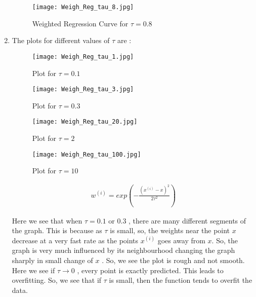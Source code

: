 \documentclass{article}
\begin{document}
\begin{enumerate}[label=(\alph*)]
        \begin{figure}[H]
            \centering
            \texttt{[image: Weigh\_Reg\_tau\_8.jpg]}
            \caption{Weighted Regression Curve for $\tau = 0.8$}
            \label{Linear_Reg_Cont_13}
         \end{figure}
         
         
    \item The plots for different values of $\tau$ are :
    
    \begin{figure}[H]
         \begin{minipage}{0.49 \textwidth}
            \texttt{[image: Weigh\_Reg\_tau\_1.jpg]}
            \caption{Plot for $\tau = 0.1$}
            \label{Linear_Reg_Cont_5}
         \end{minipage}
         \begin{minipage}{0.49 \textwidth}
            \texttt{[image: Weigh\_Reg\_tau\_3.jpg]}
            \caption{Plot for $\tau = 0.3$}
            \label{Linear_Reg_Cont_9}
            \end{minipage}
            
         \end{figure}
         
    \begin{figure}[H]
         \begin{minipage}{0.49 \textwidth}
            \texttt{[image: Weigh\_Reg\_tau\_20.jpg]}
            \caption{Plot for $\tau = 2$}
            \label{Linear_Reg_Cont_5}
         \end{minipage}
         \begin{minipage}{0.49 \textwidth}
            \texttt{[image: Weigh\_Reg\_tau\_100.jpg]}
            \caption{Plot for $\tau = 10$}
            \label{Linear_Reg_Cont_9}
            \end{minipage}
            
         \end{figure}
         
         \begin{align*}
           w^{(i)} = exp(-\frac{(x^{(i)}-x)^2}{2\tau^2})
        \end{align*}  
         
         
         Here we see that when $\tau = 0.1$ or $0.3$ , there are many different segments of the graph. This is because as $\tau$ is small, so, the weights near the point $x$ decrease at a very fast rate as the points $x^{(i)}$ goes away from $x$. So, the graph is very much influenced by its neighbourhood changing the graph sharply in small change of $x$ . So, we see the plot is rough and not smooth. Here we see if $\tau \to 0$ , every point is exactly predicted. This leads to overfitting. So, we see that if $\tau$ is small, then the function tends to overfit the data. \\
         

\end{enumerate}
\end{document}
